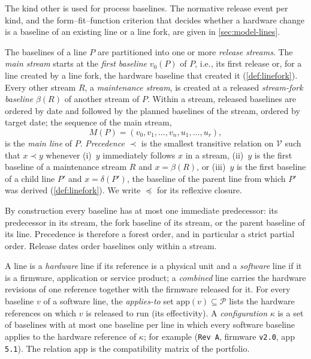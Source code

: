 The kind \textsf{other} is used for process baselines. The normative
release event per kind, and the form--fit--function criterion that decides
whether a hardware change is a baseline of an existing line or a line
fork, are given in \cref{sec:model-lines}.

\begin{definition}
  \label{def:mainline}
  The baselines of a line $P$ are partitioned into one or more
  \emph{release streams}. The \emph{main stream} starts at the
  \emph{first baseline} $v_0(P)$ of $P$, i.e., its first release or, for a
  line created by a line fork, the hardware baseline that created it
  (\cref{def:linefork}). Every other stream $R$, a \emph{maintenance
  stream}, is created at a released \emph{stream-fork baseline}
  $\beta(R)$ of another stream of $P$. Within a stream, released baselines
  are ordered by date and followed by the planned baselines of the stream,
  ordered by target date; the sequence of the main stream,
  \[
    M(P) = (v_0, v_1, \dots, v_n, u_1, \dots, u_r),
  \]
  is the \emph{main line} of $P$. \emph{Precedence} $\prec$ is the smallest
  transitive relation on $\mathcal{V}$ such that $x \prec y$ whenever
  (i)~$y$ immediately follows $x$ in a stream, (ii)~$y$ is the first
  baseline of a maintenance stream $R$ and $x = \beta(R)$, or (iii)~$y$ is
  the first baseline of a child line $P'$ and $x = \delta(P')$, the
  baseline of the parent line from which $P'$ was derived
  (\cref{def:linefork}). We write $\preceq$ for its reflexive closure.
\end{definition}

By construction every baseline has at most one immediate predecessor: its
predecessor in its stream, the fork baseline of its stream, or the parent
baseline of its line. Precedence is therefore a forest order, and in
particular a strict partial order. Release dates order baselines only
within a stream.

\begin{definition}
  \label{def:config}
  A line is a \emph{hardware} line if its reference is a physical unit and
  a \emph{software} line if it is a firmware, application or service
  product; a \emph{combined} line carries the hardware revisions of one
  reference together with the firmware released for it. For every
  baseline $v$ of a software line, the \emph{applies-to} set
  $\mathrm{app}(v) \subseteq \mathcal{P}$ lists the hardware references on
  which $v$ is released to run (its effectivity). A \emph{configuration}
  $\kappa$ is a set of baselines with at most one baseline per line in
  which every software baseline applies to the hardware reference of
  $\kappa$; for example (\texttt{Rev~A}, firmware \texttt{v2.0}, app
  \texttt{5.1}). The relation $\mathrm{app}$ is the compatibility matrix
  of the portfolio.
\end{definition}

